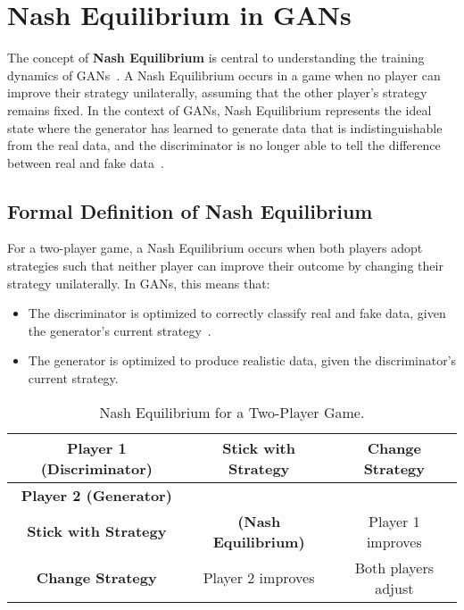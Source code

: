 \section{Nash Equilibrium in GANs}
The concept of \textbf{Nash Equilibrium} is central to understanding the training dynamics of GANs~\cite{farnia2020gans}. A Nash Equilibrium occurs in a game when no player can improve their strategy unilaterally, assuming that the other player's strategy remains fixed. In the context of GANs, Nash Equilibrium represents the ideal state where the generator has learned to generate data that is indistinguishable from the real data, and the discriminator is no longer able to tell the difference between real and fake data~\cite{farnia2020gans}.

\subsection{Formal Definition of Nash Equilibrium}
For a two-player game, a Nash Equilibrium occurs when both players adopt strategies such that neither player can improve their outcome by changing their strategy unilaterally. In GANs, this means that:

\begin{itemize}
    \item The discriminator is optimized to correctly classify real and fake data, given the generator's current strategy~\cite{ho2019real}.
    \item The generator is optimized to produce realistic data, given the discriminator's current strategy.
\end{itemize}

\begin{table}[htbp]
    \centering
    \begin{tabular}{|c|c|c|}
        \hline
        \textbf{Player 1 (Discriminator)} & \textbf{Stick with Strategy} & \textbf{Change Strategy} \\
        \hline
        \textbf{Player 2 (Generator)} &  &  \\
        \textbf{Stick with Strategy} & \textbf{(Nash Equilibrium)} & Player 1 improves \\
        \hline
        \textbf{Change Strategy} & Player 2 improves & Both players adjust \\
        \hline
    \end{tabular}
    \caption{Nash Equilibrium for a Two-Player Game.}
\end{table}


